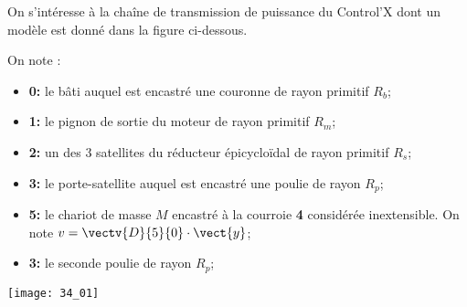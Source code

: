 \normaltrue \difficilefalse \tdifficilefalse
\correctionfalse

\setcounter{question}{0}
\ifcorrection
\else
{}
\fi

\ifprof
\else
On s'intéresse à la chaîne de transmission de puissance du Control'X dont un modèle est donné dans la figure ci-dessous.

On note : 
\begin{itemize}
\item \textbf{0:} le bâti auquel est encastré une couronne de rayon primitif $R_b$;
\item \textbf{1:} le pignon de sortie du moteur de rayon primitif $R_m$;
\item \textbf{2:} un des 3 satellites du réducteur épicycloïdal de rayon primitif $R_s$;
\item \textbf{3:} le porte-satellite auquel est encastré une poulie de rayon $R_p$;
\item \textbf{5:} le chariot de masse $M$ encastré à la courroie \textbf{4} considérée inextensible. On note $v=\vectv{D}{5}{0}\cdot \vect{y}$;
\item \textbf{3:} le seconde poulie de rayon $R_p$;
\end{itemize}

\begin{center}
\centering
\texttt{[image: 34\_01]}
\end{center}
\fi

\ifprof	
\else
\fi

\ifprof
\else
\fi



\ifprof	
\else
\fi

\ifprof
\else
{}
\fi
